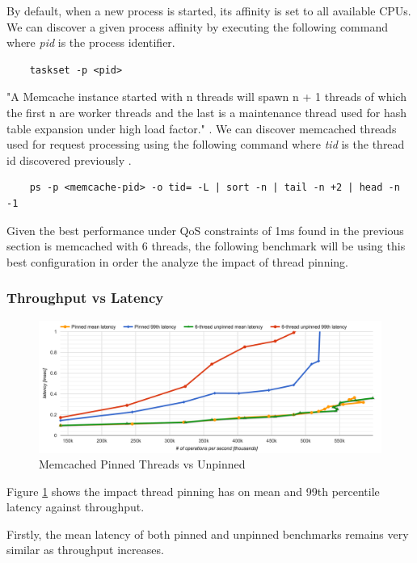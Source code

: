 By default, when a new process is started, its affinity is set to all available CPUs. We can discover a given process affinity by executing the following command where \textit{pid} is the process identifier.

\begin{lstlisting}
    taskset -p <pid>
\end{lstlisting}


"A Memcache instance started with n threads will spawn n + 1 threads of which the first n are worker threads and the last is a maintenance thread used for hash table expansion under high load factor." \cite{solarflarememcached}. We can discover memcached threads used for request processing using the following command where \textit{tid} is the thread id discovered previously \cite{solarflarememcached}.
\begin{lstlisting}
    ps -p <memcache-pid> -o tid= -L | sort -n | tail -n +2 | head -n -1
\end{lstlisting}

Given the best performance under QoS constraints of 1ms found in the previous section is memcached with 6 threads, the following benchmark will be using this best configuration in order the analyze the impact of thread pinning.

\subsubsection{Throughput vs Latency}

\begin{figure}[h]
    \includegraphics[width=\textwidth]{./res/5_threads_pinned.png}
    \caption{Memcached Pinned Threads vs Unpinned}
    \label{fig:memcached-threads-pinned}
\end{figure}

Figure \ref{fig:memcached-threads-pinned} shows the impact thread pinning has on mean and 99th percentile latency against throughput.

Firstly, the mean latency of both pinned and unpinned benchmarks remains very similar as throughput increases.


